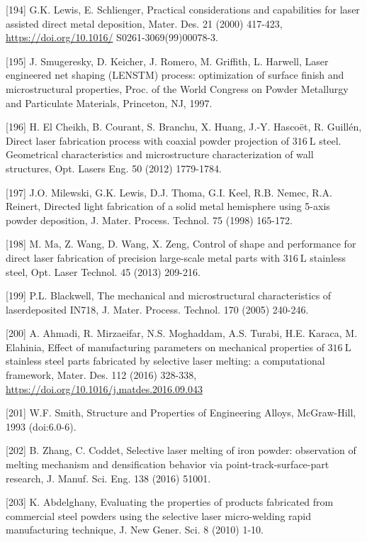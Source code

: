 \documentclass[10pt]{article}
\begin{document}
[194] G.K. Lewis, E. Schlienger, Practical considerations and capabilities for laser assisted direct metal deposition, Mater. Des. 21 (2000) 417-423, \href{https://doi.org/10.1016/}{https://doi.org/10.1016/} S0261-3069(99)00078-3.

[195] J. Smugeresky, D. Keicher, J. Romero, M. Griffith, L. Harwell, Laser engineered net shaping (LENSTM) process: optimization of surface finish and microstructural properties, Proc. of the World Congress on Powder Metallurgy and Particulate Materials, Princeton, NJ, 1997.

[196] H. El Cheikh, B. Courant, S. Branchu, X. Huang, J.-Y. Hascoët, R. Guillén, Direct laser fabrication process with coaxial powder projection of $316 \mathrm{~L}$ steel. Geometrical characteristics and microstructure characterization of wall structures, Opt. Lasers Eng. 50 (2012) 1779-1784.

[197] J.O. Milewski, G.K. Lewis, D.J. Thoma, G.I. Keel, R.B. Nemec, R.A. Reinert, Directed light fabrication of a solid metal hemisphere using 5-axis powder deposition, J. Mater. Process. Technol. 75 (1998) 165-172.

[198] M. Ma, Z. Wang, D. Wang, X. Zeng, Control of shape and performance for direct laser fabrication of precision large-scale metal parts with $316 \mathrm{~L}$ stainless steel, Opt. Laser Technol. 45 (2013) 209-216.

[199] P.L. Blackwell, The mechanical and microstructural characteristics of laserdeposited IN718, J. Mater. Process. Technol. 170 (2005) 240-246.

[200] A. Ahmadi, R. Mirzaeifar, N.S. Moghaddam, A.S. Turabi, H.E. Karaca, M. Elahinia, Effect of manufacturing parameters on mechanical properties of $316 \mathrm{~L}$ stainless steel parts fabricated by selective laser melting: a computational framework, Mater. Des. 112 (2016) 328-338, \href{https://doi.org/10.1016/j.matdes.2016.09.043}{https://doi.org/10.1016/j.matdes.2016.09.043}

[201] W.F. Smith, Structure and Properties of Engineering Alloys, McGraw-Hill, 1993 (doi:6.0-6).

[202] B. Zhang, C. Coddet, Selective laser melting of iron powder: observation of melting mechanism and densification behavior via point-track-surface-part research, J. Manuf. Sci. Eng. 138 (2016) 51001.

[203] K. Abdelghany, Evaluating the properties of products fabricated from commercial steel powders using the selective laser micro-welding rapid manufacturing technique, J. New Gener. Sci. 8 (2010) 1-10.
\end{document}

